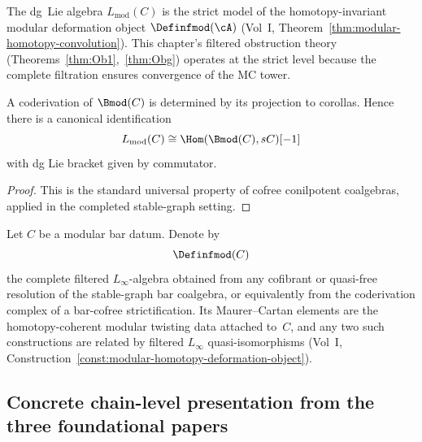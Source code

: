 \begin{remark}
\label{rem:lmod-strict-model}
The dg~Lie algebra $L_{\mathrm{mod}}(C)$ is the strict model of
the homotopy-invariant modular deformation object
$\Definfmod(\cA)$ (Vol~I,
Theorem~\ref*{thm:modular-homotopy-convolution}).
This chapter's filtered obstruction theory
(Theorems~\ref{thm:Ob1},~\ref{thm:Obg}) operates at the strict
level because the complete filtration ensures convergence of the
MC tower.
\end{remark}

\begin{proposition}
A coderivation of $\Bmod(C)$ is determined by its projection to corollas. Hence there is
a canonical identification
\[
L_{\mathrm{mod}}(C)\cong \Hom(\Bmod(C),sC)[-1]
\]
with dg Lie bracket given by commutator.
\end{proposition}

\begin{proof}
This is the standard universal property of cofree conilpotent coalgebras, applied in the
completed stable-graph setting.
\end{proof}

\begin{construction}
\label{const:vol2-homotopy-modular-object}
Let $C$ be a modular bar datum.  Denote by
\[
\Definfmod(C)
\]
the complete filtered $L_\infty$-algebra obtained from any cofibrant or
quasi-free resolution of the stable-graph bar coalgebra, or equivalently
from the coderivation complex of a bar-cofree strictification.  Its
Maurer--Cartan elements are the homotopy-coherent modular twisting data
attached to~$C$, and any two such constructions are related by filtered
$L_\infty$ quasi-isomorphisms
(Vol~I, Construction~\ref*{const:modular-homotopy-deformation-object}).
\end{construction}


\subsection{Concrete chain-level presentation from the three foundational papers}
\label{subsec:vol2-three-preprints-chain-level}

